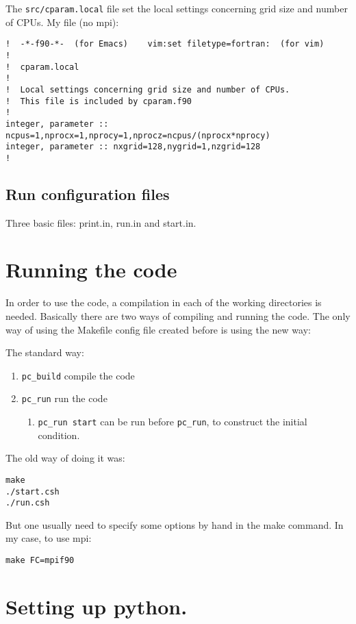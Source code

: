 \documentclass[a4paper,12pt]{article}
\begin{document}
The \texttt{src/cparam.local} file set the local settings concerning grid size
and number of CPUs. My file (no mpi):
\begin{verbatim}
!  -*-f90-*-  (for Emacs)    vim:set filetype=fortran:  (for vim)
!
!  cparam.local
!
!  Local settings concerning grid size and number of CPUs.
!  This file is included by cparam.f90
!
integer, parameter :: ncpus=1,nprocx=1,nprocy=1,nprocz=ncpus/(nprocx*nprocy)
integer, parameter :: nxgrid=128,nygrid=1,nzgrid=128
!
\end{verbatim}

\subsection{Run configuration files}
Three basic files: print.in, run.in and start.in.


\section{Running the code}

In order to use the code, a compilation in each of the working directories is
needed. Basically there are two ways of compiling and running the code.
The only way of using the Makefile config file created before is using the new
way:

The standard way:
\begin{enumerate}
  \item \verb|pc_build| compile the code
  \item \verb|pc_run| run the code
    \begin{enumerate}
      \item \verb|pc_run start| can be run before \verb|pc_run|, to construct
        the initial condition.
    \end{enumerate}
\end{enumerate}

The old way of doing it was:
\begin{verbatim}
make
./start.csh
./run.csh
\end{verbatim}
But one usually need to specify some options by hand in the make command. In my
case, to use mpi:
\begin{verbatim}
make FC=mpif90
\end{verbatim}

\section{Setting up python.}
\end{document}
